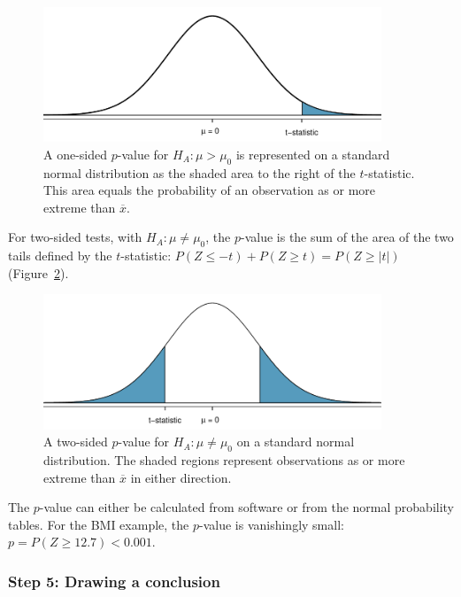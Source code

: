 \begin{spacing}{1.5}
\begin{figure}[h]
	\centering
	\includegraphics[width=0.9\textwidth]{ch_inference_foundations_oi_biostat/figures/pValueOneSided/pValueOneSided}
	\caption{A one-sided $p$-value for $H_A: \mu > \mu_0$ is represented on a standard normal distribution as the shaded area to the right of the $t$-statistic. This area equals the probability of an observation as or more extreme than $\overline{x}$.}
	\label{pValueOneSided}
\end{figure}

For two-sided tests, with $H_A: \mu \neq \mu_0$, the $p$-value is the sum of the area of the two tails defined by the $t$-statistic: $P(Z \leq -t) + P(Z \geq t) = P(Z \geq |t| )$ (Figure~\ref{pValueTwoSided}).

\begin{figure}[h]
	\centering
	\includegraphics[width=0.9\textwidth]{ch_inference_foundations_oi_biostat/figures/pValueTwoSided/pValueTwoSided}
	\caption{A two-sided $p$-value for $H_A: \mu \neq \mu_0$ on a standard normal distribution. The shaded regions represent observations as or more extreme than $\overline{x}$ in either direction.}
	\label{pValueTwoSided}
\end{figure}

The $p$-value can either be calculated from software or from the normal probability tables. For the BMI example, the $p$-value is vanishingly small: $p = P(Z \geq 12.7) < 0.001$.

\subsubsection{Step 5: Drawing a conclusion}


\end{spacing}
